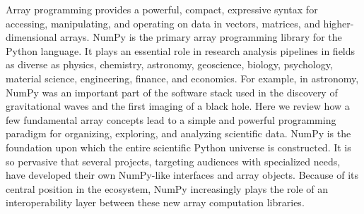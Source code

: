 




Array programming provides a powerful, compact, expressive syntax for accessing,
manipulating, and operating on data in vectors, matrices, and
higher-dimensional arrays. %
NumPy is the primary array programming library for the Python language.
It plays an essential role in research analysis pipelines in fields as
diverse as physics, chemistry, astronomy, geoscience, biology, psychology,
material science, engineering, finance, and economics.
For example, in astronomy, NumPy was an important part of the software stack used
in the discovery of gravitational waves %
and the first imaging of a black hole. %
Here we review how a few fundamental array concepts lead to a simple and
powerful programming paradigm for organizing, exploring, and analyzing
scientific data.
NumPy is the foundation upon which the entire scientific Python
universe is constructed. It is so pervasive that several projects,
targeting audiences with specialized needs, have developed their own
NumPy-like interfaces and array objects. Because of its central position in the
ecosystem, NumPy increasingly plays the role of an interoperability layer
between these new array computation libraries.

